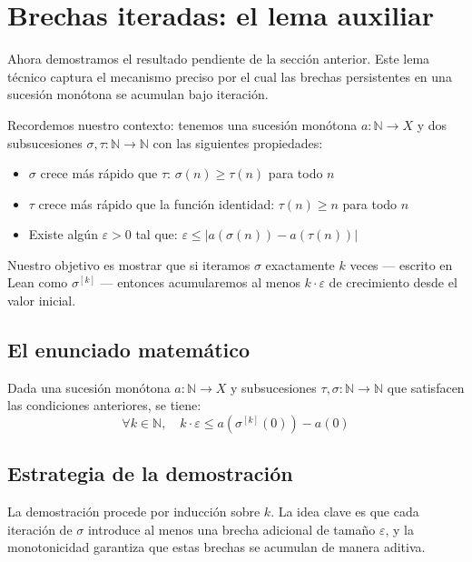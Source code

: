 \section{Brechas iteradas: el lema auxiliar}

Ahora demostramos el resultado pendiente de la sección anterior. Este
lema técnico captura el mecanismo preciso por el cual las brechas
persistentes en una sucesión monótona se acumulan bajo iteración.

Recordemos nuestro contexto: tenemos una sucesión monótona
$a : \mathbb{N} \to X$ y dos subsucesiones $\sigma, \tau : \mathbb{N} \to
\mathbb{N}$ con las siguientes propiedades:
\begin{itemize}[nosep]
  \item $\sigma$ crece más rápido que $\tau$: $\sigma(n) \geq \tau(n)$
    para todo $n$
  \item $\tau$ crece más rápido que la función identidad: $\tau(n) \geq n$
    para todo $n$
  \item Existe algún $\varepsilon > 0$ tal que:
    $\varepsilon \leq |a(\sigma(n)) - a(\tau(n))|$
\end{itemize}

Nuestro objetivo es mostrar que si iteramos $\sigma$ exactamente $k$
veces --- escrito en Lean como $\sigma^{[k]}$ --- entonces acumularemos al
menos $k \cdot \varepsilon$ de crecimiento desde el valor inicial.

\subsection{El enunciado matemático}

\begin{theorem}
Dada una sucesión monótona $a : \mathbb{N} \to X$ y subsucesiones
$\tau, \sigma : \mathbb{N} \to \mathbb{N}$ que satisfacen las condiciones
anteriores, se tiene:
\[
  \forall k \in \mathbb{N},\quad k \cdot \varepsilon \leq a(\sigma^{[k]}(0)) - a(0)
\]
\end{theorem}

\subsection{Estrategia de la demostración}

La demostración procede por inducción sobre $k$. La idea clave es que
cada iteración de $\sigma$ introduce al menos una brecha adicional de
tamaño $\varepsilon$, y la monotonicidad garantiza que estas brechas se
acumulan de manera aditiva.

